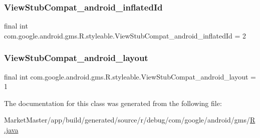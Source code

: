 \subsubsection{\texorpdfstring{View\+Stub\+Compat\+\_\+android\+\_\+inflated\+Id}{ViewStubCompat\_android\_inflatedId}}
{\footnotesize\ttfamily final int com.\+google.\+android.\+gms.\+R.\+styleable.\+View\+Stub\+Compat\+\_\+android\+\_\+inflated\+Id = 2\hspace{0.3cm}{\ttfamily [static]}}

\mbox{\label{classcom_1_1google_1_1android_1_1gms_1_1R_1_1styleable_adf405a425f20196ab1d938387ec0f39c}} 
\subsubsection{\texorpdfstring{View\+Stub\+Compat\+\_\+android\+\_\+layout}{ViewStubCompat\_android\_layout}}
{\footnotesize\ttfamily final int com.\+google.\+android.\+gms.\+R.\+styleable.\+View\+Stub\+Compat\+\_\+android\+\_\+layout = 1\hspace{0.3cm}{\ttfamily [static]}}



The documentation for this class was generated from the following file\+:\begin{DoxyCompactItemize}
\item 
Market\+Master/app/build/generated/source/r/debug/com/google/android/gms/\mbox{\hyperlink{debug_2com_2google_2android_2gms_2R_8java}{R.\+java}}\end{DoxyCompactItemize}
